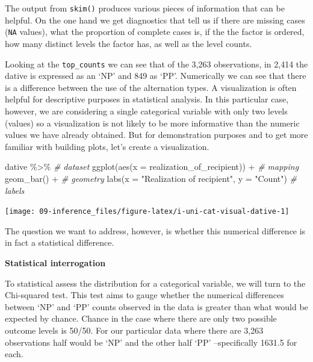 \documentclass[
]{article}
\newenvironment{Shaded}{\begin{snugshade}}{\end{snugshade}}
\newcommand{\AttributeTok}[1]{\textcolor[rgb]{0.77,0.63,0.00}{#1}}
\newcommand{\CommentTok}[1]{\textcolor[rgb]{0.56,0.35,0.01}{\textit{#1}}}
\newcommand{\FunctionTok}[1]{\textcolor[rgb]{0.00,0.00,0.00}{#1}}
\newcommand{\NormalTok}[1]{#1}
\newcommand{\SpecialCharTok}[1]{\textcolor[rgb]{0.00,0.00,0.00}{#1}}
\newcommand{\StringTok}[1]{\textcolor[rgb]{0.31,0.60,0.02}{#1}}
\begin{document}
The output from \texttt{skim()} produces various pieces of information that can be helpful. On the one hand we get diagnostics that tell us if there are missing cases (\texttt{NA} values), what the proportion of complete cases is, if the the factor is ordered, how many distinct levels the factor has, as well as the level counts.

Looking at the \texttt{top\_counts} we can see that of the 3,263 observations, in 2,414 the dative is expressed as an `NP' and 849 as `PP'. Numerically we can see that there is a difference between the use of the alternation types. A visualization is often helpful for descriptive purposes in statistical analysis. In this particular case, however, we are considering a single categorical variable with only two levels (values) so a visualization is not likely to be more informative than the numeric values we have already obtained. But for demonstration purposes and to get more familiar with building plots, let's create a visualization.

\begin{Shaded}
\begin{Highlighting}[]
\NormalTok{dative }\SpecialCharTok{\%\textgreater{}\%} \CommentTok{\# dataset}
  \FunctionTok{ggplot}\NormalTok{(}\FunctionTok{aes}\NormalTok{(}\AttributeTok{x =}\NormalTok{ realization\_of\_recipient)) }\SpecialCharTok{+} \CommentTok{\# mapping}
  \FunctionTok{geom\_bar}\NormalTok{() }\SpecialCharTok{+} \CommentTok{\# geometry}
  \FunctionTok{labs}\NormalTok{(}\AttributeTok{x =} \StringTok{"Realization of recipient"}\NormalTok{, }\AttributeTok{y =} \StringTok{"Count"}\NormalTok{) }\CommentTok{\# labels}
\end{Highlighting}
\end{Shaded}

\begin{center}\texttt{[image: 09-inference\_files/figure-latex/i-uni-cat-visual-dative-1]} \end{center}

The question we want to address, however, is whether this numerical difference is in fact a statistical difference.

\textbf{Statistical interrogation}

To statistical assess the distribution for a categorical variable, we will turn to the Chi-squared test. This test aims to gauge whether the numerical differences between `NP' and `PP' counts observed in the data is greater than what would be expected by chance. Chance in the case where there are only two possible outcome levels is 50/50. For our particular data where there are 3,263 observations half would be `NP' and the other half `PP' --specifically 1631.5 for each.
\end{document}
